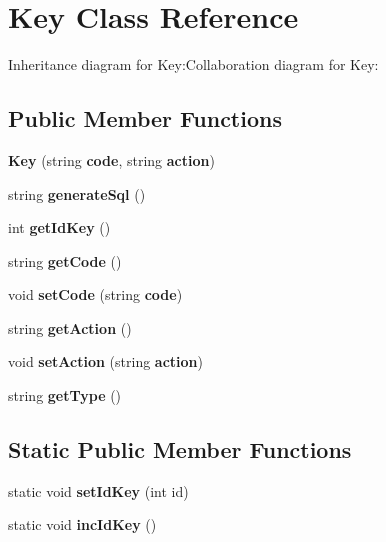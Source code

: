 \section{Key Class Reference}
\label{classbr_1_1ufscar_1_1lince_1_1ginga_1_1recommender_1_1Key}
Inheritance diagram for Key:Collaboration diagram for Key:\subsection*{Public Member Functions}
\begin{CompactItemize}
\item 
\textbf{Key} (string {\bf code}, string {\bf action})\label{classbr_1_1ufscar_1_1lince_1_1ginga_1_1recommender_1_1Key_b5886106674b9eb8b8387bdafd2a32aa}

\item 
string \textbf{generateSql} ()\label{classbr_1_1ufscar_1_1lince_1_1ginga_1_1recommender_1_1Key_8f1e45f781da9a5727416350efd7d586}

\item 
int \textbf{getIdKey} ()\label{classbr_1_1ufscar_1_1lince_1_1ginga_1_1recommender_1_1Key_ae3cac7165f1df5c5f80cd955eb1d8e0}

\item 
string \textbf{getCode} ()\label{classbr_1_1ufscar_1_1lince_1_1ginga_1_1recommender_1_1Key_e205df7d73e2cb53391318130a4aa4c1}

\item 
void \textbf{setCode} (string {\bf code})\label{classbr_1_1ufscar_1_1lince_1_1ginga_1_1recommender_1_1Key_768a2bedbc03f4d02bf66bed9c5d73ec}

\item 
string \textbf{getAction} ()\label{classbr_1_1ufscar_1_1lince_1_1ginga_1_1recommender_1_1Key_85932f60bf6630bd66084fc70576eead}

\item 
void \textbf{setAction} (string {\bf action})\label{classbr_1_1ufscar_1_1lince_1_1ginga_1_1recommender_1_1Key_97edc6835d07e4fe53a53c987470fe7b}

\item 
string \textbf{getType} ()\label{classbr_1_1ufscar_1_1lince_1_1ginga_1_1recommender_1_1Key_eeccf2c5d2bcb819ece9be283400bb5a}

\end{CompactItemize}
\subsection*{Static Public Member Functions}
\begin{CompactItemize}
\item 
static void \textbf{setIdKey} (int id)\label{classbr_1_1ufscar_1_1lince_1_1ginga_1_1recommender_1_1Key_3591a5be67b58edc409daa2512bf5950}

\item 
static void \textbf{incIdKey} ()\label{classbr_1_1ufscar_1_1lince_1_1ginga_1_1recommender_1_1Key_34311d5e6ef5e8926e90af2a7da1a6d6}

\end{CompactItemize}
